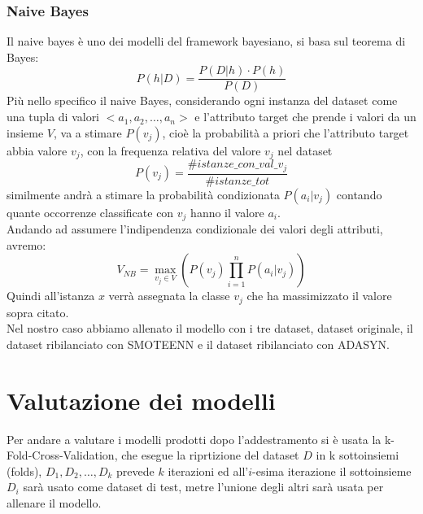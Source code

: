 \documentclass[italian,12pt,a4paper]{article}
\begin{document}
	
	\subsubsection{Naive Bayes}
	
	Il naive bayes è uno dei modelli del framework bayesiano, si basa sul teorema di Bayes:
	$$P(h|D) = \frac{P(D|h)\cdot P(h)}{P(D)}$$
	Più nello specifico il naive Bayes, considerando ogni instanza del dataset come una tupla di valori $<a_1, a_2, \dots, a_n>$ e l'attributo target che prende i valori da un insieme $V$, va a stimare $P(v_j)$, cioè la probabilità a priori che l'attributo target abbia valore $v_j$, con la frequenza relativa del valore $v_j$ nel dataset $$P(v_j) = \frac{\#istanze\_con\_val\_v_j}{\#istanze\_tot}$$ similmente andrà a stimare la probabilità condizionata $P(a_i|v_j)$ contando quante occorrenze classificate con $v_j$ hanno il valore $a_i$. \\
	Andando ad assumere l'indipendenza condizionale dei valori degli attributi, avremo:
	$$V_{NB} = \max_{v_j \in V}(P(v_j)\prod_{i = 1}^{n} P(a_i|v_j))$$
	Quindi all'istanza $x$ verrà assegnata la classe $v_j$ che ha massimizzato il valore sopra citato. \\
	Nel nostro caso abbiamo allenato il modello con i tre dataset, dataset originale, il dataset ribilanciato con SMOTEENN e il dataset ribilanciato con ADASYN.
	
	\section{Valutazione dei modelli}
	Per andare a valutare i modelli prodotti dopo l'addestramento si è usata la k-Fold-Cross-Validation, che esegue la riprtizione del dataset $D$ in k sottoinsiemi (folds), $D_1, D_2, \dots, D_k$ prevede $k$ iterazioni ed all'$i$-esima iterazione il sottoinsieme $D_i$ sarà usato come dataset di test, metre l'unione degli altri sarà usata per allenare il modello.
	
\end{document}
